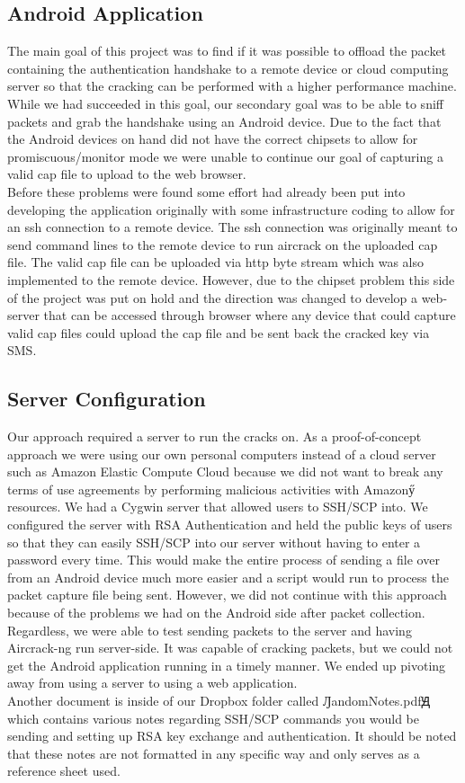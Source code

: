 \documentclass[12pt, titlepage]{article}
\begin{document}
\subsection{Android Application}
The main goal of this project was to find if it was possible to offload the packet containing the authentication handshake to a remote device or cloud computing server so that the cracking can be performed with a higher performance machine.  While we had succeeded in this goal, our secondary goal was to be able to sniff packets and grab the handshake using an Android device.  Due to the fact that the Android devices on hand did not have the correct chipsets to allow for promiscuous/monitor mode we were unable to continue our goal of capturing a valid cap file to upload to the web browser.  
\\
Before these problems were found some effort had already been put into developing the application originally with some infrastructure coding to allow for an ssh connection to a remote device.  The ssh connection was originally meant to send command lines to the remote device to run aircrack on the uploaded cap file.  The valid cap file can be uploaded via http byte stream which was also implemented to the remote device.  However, due to the chipset problem this side of the project was put on hold and the direction was changed to develop a web-server that can be accessed through browser where any device that could capture valid cap files could upload the cap file and be sent back the cracked key via SMS.  

\subsection{Server Configuration}
Our approach required a server to run the cracks on. As a proof-of-concept approach we were using our own personal computers instead of a cloud server such as Amazon Elastic Compute Cloud because we did not want to break any terms of use agreements by performing malicious activities with Amazonӳ resources. We had a Cygwin server that allowed users to SSH/SCP into. We configured the server with RSA Authentication and held the public keys of users so that they can easily SSH/SCP into our server without having to enter a password every time. This would make the entire process of sending a file over from an Android device much more easier and a script would run to process the packet capture file being sent. However, we did not continue with this approach because of the problems we had on the Android side after packet collection. Regardless, we were able to test sending packets to the server and having Aircrack-ng run server-side. It was capable of cracking packets, but we could not get the Android application running in a timely manner. We ended up pivoting away from using a server to using a web application.
\\
Another document is inside of our Dropbox folder called ԒandomNotes.pdfԬ which contains various notes regarding SSH/SCP commands you would be sending and setting up RSA key exchange and authentication. It should be noted that these notes are not formatted in any specific way and only serves as a reference sheet used.
\end{document}
